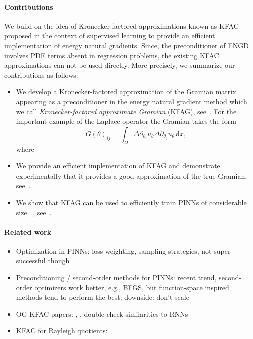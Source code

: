 \paragraph{Contributions} 
We build on the idea of Kronecker-factored approximations known as KFAC proposed in the context of supervised learning to provide an efficient implementation of energy natural gradients. 
Since, the preconditioner of ENGD involves PDE terms absent in regression problems, the existing KFAC approximations can not be used directly. 
More precisely, we summarize our contributions as follows: 
\begin{itemize}
    \item We develop a Kronecker-factored approximation of the Gramian matrix appearing as a preconditioner in the energy natural gradient method which we call \emph{Kronecker-factored approximate Gramian} (KFAG), see~. For the important example of the Laplace operator the Gramian takes the form
    \begin{equation*}
        G(\theta)_{ij}
        =
        \int_\Omega \Delta \partial_{\theta_i} u_\theta \Delta \partial_{\theta_j} u_\theta \, \mathrm dx, 
    \end{equation*}
    where 
    
    
    \item We provide an efficient implementation of KFAG and demonstrate experimentally that it provides a good approximation of the true Gramian, see~. 
    \item We show that KFAG can be used to efficiently train PINNs of considerable size..., see~. 
\end{itemize}

\paragraph{Related work}
\begin{itemize}
    \item Optimization in PINNs: loss weighting, sampling strategies, not super successful though
    \item Preconditioning / second-order methods for PINNs: recent trend, second-order optimizers work better, e.g., BFGS, but function-space inspired methods tend to perform the best; downside: don't scale 
    \item OG KFAC papers: \cite{martens2015optimizing}, \cite{martens2018kroneckerfactored}, double check similarities to RNNs
    \item KFAC for Rayleigh quotients:
\end{itemize}

